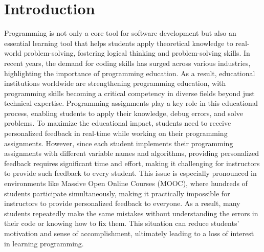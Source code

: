 \documentclass[10pt,conference]{IEEEtran}
\begin{document}
\section{Introduction}
    Programming is not only a core tool for software development but also an essential learning tool that helps students apply theoretical knowledge to real-world problem-solving, fostering logical thinking and problem-solving skills. In recent years, the demand for coding skills has surged across various industries, highlighting the importance of programming education. As a result, educational institutions worldwide are strengthening programming education, with programming skills becoming a critical competency in diverse fields beyond just technical expertise. Programming assignments play a key role in this educational process, enabling students to apply their knowledge, debug errors, and solve problems. To maximize the educational impact, students need to receive personalized feedback in real-time while working on their programming assignments. However, since each student implements their programming assignments with different variable names and algorithms, providing personalized feedback requires significant time and effort, making it challenging for instructors to provide such feedback to every student. This issue is especially pronounced in environments like Massive Open Online Courses (MOOC), where hundreds of students participate simultaneously, making it practically impossible for instructors to provide personalized feedback to everyone. As a result, many students repeatedly make the same mistakes without understanding the errors in their code or knowing how to fix them. This situation can reduce students' motivation and sense of accomplishment, ultimately leading to a loss of interest in learning programming.
\end{document}
